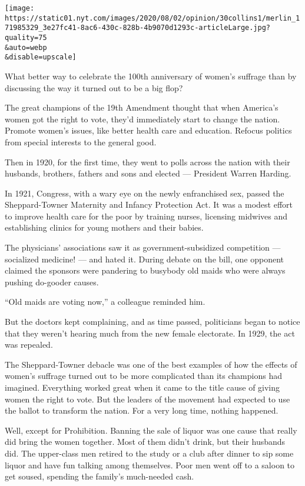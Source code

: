 \texttt{[image: https://static01.nyt.com/images/2020/08/02/opinion/30collins1/merlin\_171985329\_3e27fc41-8ac6-430c-828b-4b9070d1293c-articleLarge.jpg?quality=75\\\&auto=webp\\\&disable=upscale]}

What better way to celebrate the 100th anniversary of women's suffrage
than by discussing the way it turned out to be a big flop?

The great champions of the 19th Amendment thought that when America's
women got the right to vote, they'd immediately start to change the
nation. Promote women's issues, like better health care and education.
Refocus politics from special interests to the general good.

Then in 1920, for the first time, they went to polls across the nation
with their husbands, brothers, fathers and sons and elected ---
President Warren Harding.

In 1921, Congress, with a wary eye on the newly enfranchised sex, passed
the Sheppard-Towner Maternity and Infancy Protection Act. It was a
modest effort to improve health care for the poor by training nurses,
licensing midwives and establishing clinics for young mothers and their
babies.

The physicians' associations saw it as government-subsidized competition
--- socialized medicine! --- and hated it. During debate on the bill,
one opponent claimed the sponsors were pandering to busybody old maids
who were always pushing do-gooder causes.

``Old maids are voting now,'' a colleague reminded him.

But the doctors kept complaining, and as time passed, politicians began
to notice that they weren't hearing much from the new female electorate.
In 1929, the act was repealed.

The Sheppard-Towner debacle was one of the best examples of how the
effects of women's suffrage turned out to be more complicated than its
champions had imagined. Everything worked great when it came to the
title cause of giving women the right to vote. But the leaders of the
movement had expected to use the ballot to transform the nation. For a
very long time, nothing happened.

Well, except for Prohibition. Banning the sale of liquor was one cause
that really did bring the women together. Most of them didn't drink, but
their husbands did. The upper-class men retired to the study or a club
after dinner to sip some liquor and have fun talking among themselves.
Poor men went off to a saloon to get soused, spending the family's
much-needed cash.


